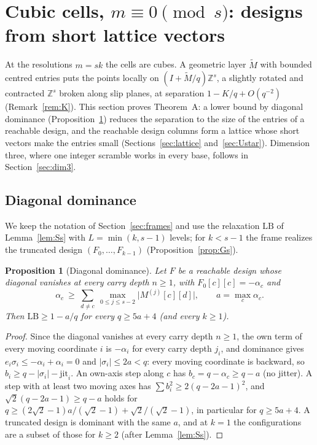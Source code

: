 \documentclass[11pt]{amsart}
\newtheorem{proposition}[theorem]{Proposition}
\theoremstyle{definition}
\theoremstyle{plain}
\newcommand{\Z}{\mathbb{Z}}
\begin{document}
\section{Cubic cells, \texorpdfstring{$m\equiv0\pmod s$}{m = 0 mod s}: designs from short lattice vectors}\label{sec:dims}\label{sec:small}
At the resolutions $m=sk$ the cells are cubes. A geometric layer $\tilde M$ with bounded centred entries puts the points locally on $(I+\tilde M/q)\Z^s$, a slightly rotated and contracted $\Z^s$ broken along slip planes, at separation $1-K/q+O(q^{-2})$ (Remark~\ref{rem:K}). This section proves Theorem~A: a lower bound by diagonal dominance (Proposition~\ref{prop:D}) reduces the separation to the size of the entries of a reachable design, and the reachable design columns form a lattice whose short vectors make the entries small (Sections~\ref{sec:lattice} and~\ref{sec:Ustar}). Dimension three, where one integer scramble works in every base, follows in Section~\ref{sec:dim3}.

\subsection{Diagonal dominance}
We keep the notation of Section~\ref{sec:frames} and use the relaxation $\mathrm{LB}$ of Lemma~\ref{lem:Ss} with $L=\min(k,s-1)$ levels; for $k<s-1$ the frame realizes the truncated design $(F_0,\dots,F_{k-1})$ (Proposition~\ref{prop:Gs}).

\label{sec:U}
\begin{proposition}[Diagonal dominance]\label{prop:D}
Let $F$ be a reachable design whose diagonal vanishes at every carry depth $n\ge1$, with $F_0[c][c]=-\alpha_c$ and
\[
\alpha_c\ \ge\ \sum_{d\ne c}\ \max_{0\le j\le s-2}\bigl|M^{(j)}[c][d]\bigr|,\qquad a=\max_c\alpha_c.
\]
Then $\mathrm{LB}\ge1-a/q$ for every $q\ge5a+4$ (and every $k\ge1$).
\end{proposition}

\begin{proof}
Since the diagonal vanishes at every carry depth $n\ge1$, the own term of every moving coordinate $i$ is $-\alpha_i$ for every carry depth $j_i$, and dominance gives $e_i\sigma_i\le-\alpha_i+\alpha_i=0$ and $|\sigma_i|\le2a<q$: every moving coordinate is backward, so $b_i\ge q-|\sigma_i|-\mathrm{jit}_i$. An own-axis step along $c$ has $b_c=q-\alpha_c\ge q-a$ (no jitter). A step with at least two moving axes has $\sum b_i^2\ge2(q-2a-1)^2$, and $\sqrt2(q-2a-1)\ge q-a$ holds for $q\ge(2\sqrt2-1)a/(\sqrt2-1)+\sqrt2/(\sqrt2-1)$, in particular for $q\ge5a+4$. A truncated design is dominant with the same $a$, and at $k=1$ the configurations are a subset of those for $k\ge2$ (after Lemma~\ref{lem:Ss}).
\end{proof}
\end{document}
